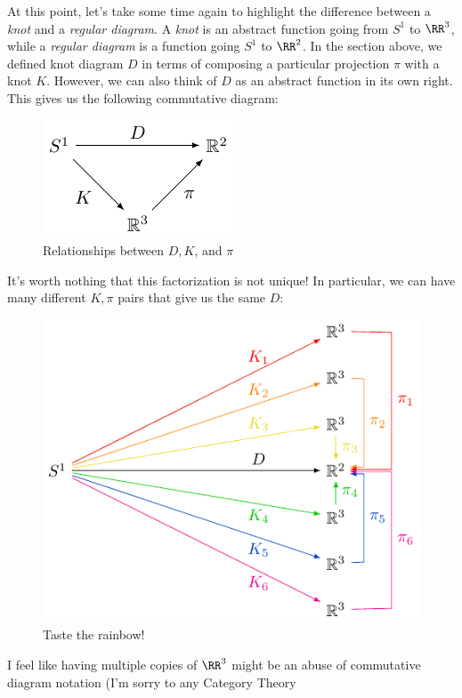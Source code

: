 \begin{remark}
  At this point, let's take some time again to highlight the
  difference between a \emph{knot} and a \emph{regular diagram}. A
  \emph{knot} is an abstract function going from $S^1$ to $\RR^3$,
  while a \emph{regular diagram} is a function going $S^1$ to $\RR^2$.
  In the section above, we defined knot diagram $D$ in terms of
  composing a particular projection $\pi$ with a knot $K$. However, we
  can also think of $D$ as an abstract function in its own right. This
  gives us the following commutative diagram:
  \begin{figure}[H]
    \centering
    \includegraphics{figures/background/D_comm_diag.pdf}
    \caption{Relationships between $D, K$, and $\pi$}
  \end{figure}
  \noindent It's worth nothing that this factorization is not unique!
  In particular, we can have many different $K,\pi$ pairs that give us
  the same $D$:
  \begin{figure}[H]
    \centering
    \includegraphics{figures/background/same_D_diff_factors.pdf}
    \caption{Taste the rainbow!}
  \end{figure}
  I feel like having multiple copies of $\RR^3$ might be an abuse of
  commutative diagram notation (I'm sorry to any Category Theory

\end{remark}
